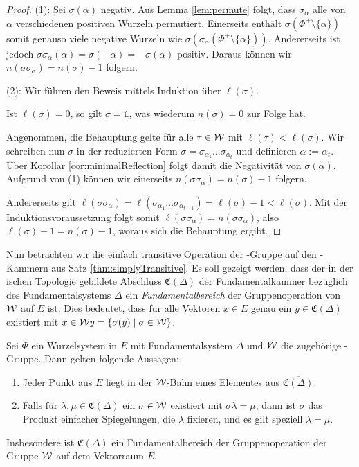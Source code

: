 \begin{proof}
  (1):
  Sei $\sigma(\alpha)$ negativ.
  Aus Lemma \ref{lem:permute} folgt, dass $\sigma_\alpha$ alle von $\alpha$ verschiedenen positiven Wurzeln permutiert.
  Einerseits enthält $\sigma(\Phi^+ \setminus \{\alpha\})$ somit genauso viele negative Wurzeln wie $\sigma(\sigma_\alpha(\Phi^+ \setminus \{\alpha\}))$.
  Andererseits ist jedoch 
  $\sigma \sigma_\alpha (\alpha) = \sigma(-\alpha) = -\sigma(\alpha)$ 
  positiv.
  Daraus können wir $n(\sigma\sigma_\alpha) = n(\sigma) - 1$ folgern.

  (2):
  Wir führen den Beweis mittels Induktion über $\ell(\sigma)$.

  Ist $\ell(\sigma)=0$, so gilt $\sigma = \mathds{1}$, was wiederum $n(\sigma)=0$ zur Folge hat.

  Angenommen, die Behauptung gelte für alle $\tau \in \mathcal{W}$ mit $\ell(\tau) < \ell(\sigma)$.
  Wir schreiben nun $\sigma$ in der reduzierten Form $\sigma = \sigma_{\alpha_1} \dots \sigma_{\alpha_t}$ und definieren $\alpha := \alpha_t$.
  Über Korollar \ref{cor:minimalReflection} folgt damit die Negativität von $\sigma(\alpha)$.
  Aufgrund von (1) können wir einerseits $n(\sigma\sigma_\alpha) = n(\sigma) - 1$ folgern.
  
  Andererseits gilt $\ell(\sigma\sigma_\alpha) = \ell(\sigma_{\alpha_1} \dots \sigma_{\alpha_{t -1}}) = \ell(\sigma) - 1 < \ell(\sigma)$.
  Mit der Induktionsvoraussetzung folgt somit $\ell(\sigma\sigma_\alpha) = n(\sigma\sigma_\alpha)$, also $\ell(\sigma) - 1 = n(\sigma) - 1$, woraus sich die Behauptung ergibt.
\end{proof}

Nun betrachten wir die einfach transitive Operation der \weyl\hyp{}Gruppe auf den \weyl\hyp{}Kammern aus Satz \ref{thm:simplyTransitive}.
Es soll gezeigt werden, dass der in der \euklid ischen Topologie gebildete Abschluss $\overline{\mathfrak{C}(\Delta)}$ der Fundamentalkammer bezüglich des Fundamentalsystems $\Delta$ ein \emph{Fundamentalbereich} der Gruppenoperation von $\mathcal{W}$ auf $E$ ist.
Dies bedeutet, dass für alle Vektoren $x \in E$ genau ein $y \in \overline{\mathfrak{C}(\Delta)}$ existiert mit $x \in \mathcal{W} y = \{\sigma(y) \mid \sigma \in \mathcal{W}\}$.

\begin{lem}
  \label{lem:fundamentalDomain}
  Sei $\Phi$ ein Wurzelsystem in $E$ mit Fundamentalsystem $\Delta$ und $\mathcal{W}$ die zugehörige \weyl\hyp{}Gruppe.
  Dann gelten folgende Aussagen:
  \begin{enumerate}[(1)]
    \item Jeder Punkt aus $E$ liegt in der $\mathcal{W}$\hyp{}Bahn eines Elementes aus  $\overline{\mathfrak{C}(\Delta)}$.
    \item Falls für $\lambda, \mu \in \overline{\mathfrak{C}(\Delta)}$ ein $\sigma \in \mathcal{W}$ existiert mit $\sigma \lambda = \mu$, dann ist $\sigma$ das Produkt einfacher Spiegelungen, die $\lambda$ fixieren, und es gilt speziell $\lambda = \mu$.
  \end{enumerate}
  Insbesondere ist $\overline{\mathfrak{C}(\Delta)}$ ein Fundamentalbereich der Gruppenoperation der Gruppe $\mathcal{W}$ auf dem Vektorraum $E$.
\end{lem}

